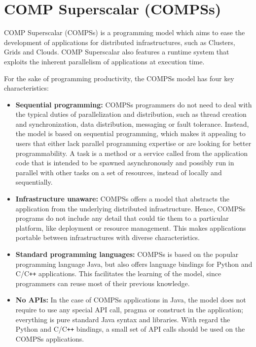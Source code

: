 \section{COMP Superscalar (COMPSs)}
\label{sec:Introduction}

COMP Superscalar (COMPSs) is a programming model which aims to ease the 
development of applications for distributed infrastructures, such as Clusters, 
Grids and Clouds. COMP Superscalar also features a runtime system that exploits 
the inherent parallelism of applications at execution time.

For the sake of programming productivity, the COMPSs model has four key 
characteristics:

\begin{itemize}
 
 \item  {\bf Sequential programming:} COMPSs programmers do not need to deal 
 with the typical duties of parallelization and distribution, such as thread 
 creation and synchronization, data distribution, messaging or fault tolerance. 
 Instead, the model is based on sequential programming, which makes it appealing 
 to users that either lack parallel programming expertise or are looking for 
 better programmability. A task is a method or a service called from the application code that is intended to be spawned asynchronously and possibly run in parallel with other tasks on a set of resources, instead of locally and sequentially.
 
 \item  {\bf Infrastructure unaware:} COMPSs offers a model that abstracts the 
 application from the underlying distributed infrastructure. Hence, COMPSs 
 programs do not include any detail that could tie them to a particular 
 platform, like deployment or resource management. This makes applications 
 portable between infrastructures with diverse characteristics.
 
 \item  {\bf Standard programming languages:} COMPSs is based on the popular 
 programming language Java, but also offers language bindings for Python and 
 C/C\texttt{++} applications. This facilitates the learning of the model, since 
 programmers can reuse most of their previous knowledge.
 
 \item  {\bf No APIs:} In the case of COMPSs applications in Java, the model 
 does not require to use any special API call, pragma or construct in the 
 application; everything is pure standard Java syntax and libraries. With 
 regard the Python and C/C\texttt{++} bindings, a small set of API calls should be used 
 on the COMPSs applications.

\end{itemize}

